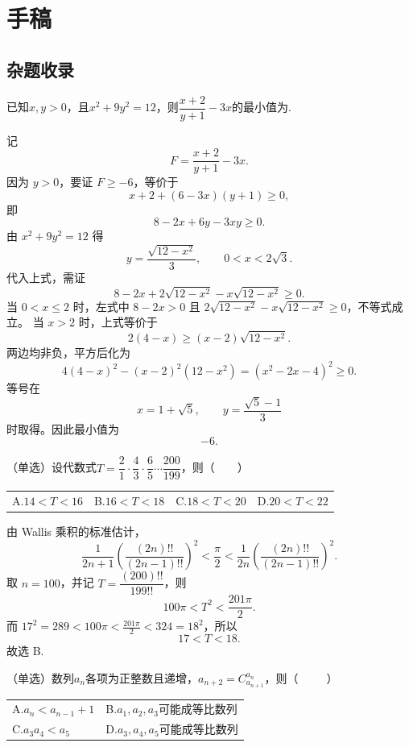 \chapter{手稿}
\section{杂题收录}
\begin{example}
    已知$x,y>0$，且$x^2+9y^2=12$，则$\dfrac{x+2}{y+1}-3x$的最小值为\underline{\hspace{2cm}}.
\end{example}
\begin{solution}
记
\[
F=\frac{x+2}{y+1}-3x.
\]
因为 $y>0$，要证 $F\ge -6$，等价于
\[
x+2+(6-3x)(y+1)\ge 0,
\]
即
\[
8-2x+6y-3xy\ge 0.
\]
由 $x^2+9y^2=12$ 得
\[
y=\frac{\sqrt{12-x^2}}{3},\qquad 0<x<2\sqrt3.
\]
代入上式，需证
\[
8-2x+2\sqrt{12-x^2}-x\sqrt{12-x^2}\ge0.
\]
当 $0<x\le2$ 时，左式中 $8-2x>0$ 且 $2\sqrt{12-x^2}-x\sqrt{12-x^2}\ge0$，不等式成立。
当 $x>2$ 时，上式等价于
\[
2(4-x)\ge (x-2)\sqrt{12-x^2}.
\]
两边均非负，平方后化为
\[
4(4-x)^2-(x-2)^2(12-x^2)=(x^2-2x-4)^2\ge0.
\]
等号在
\[
x=1+\sqrt5,\qquad y=\frac{\sqrt5-1}{3}
\]
时取得。因此最小值为
\[
-6.
\]
\end{solution}
\newpage
\begin{example}[（高考题改编）]
    （单选）设代数式$\displaystyle T = \dfrac21\cdot\dfrac{4}{3}\cdot\dfrac{6}{5}\cdots\dfrac{200}{199}$，则（~~~~）

    \begin{tabular}{@{}llll@{}}
        A.$14< T < 16$&B.$16 < T < 18$&C.$18< T < 20$&D.$20< T < 22$
    \end{tabular}
\end{example}
\begin{solution}
    由 Wallis 乘积的标准估计，
    \[
    \frac{1}{2n+1}\left(\frac{(2n)!!}{(2n-1)!!}\right)^2<\frac{\pi}{2}<\frac{1}{2n}\left(\frac{(2n)!!}{(2n-1)!!}\right)^2.
    \]
    取 $n=100$，并记 $T=\dfrac{(200)!!}{199!!}$，则
    \[
    100\pi<T^2<\frac{201\pi}{2}.
    \]
    而 $17^2=289<100\pi<\frac{201\pi}{2}<324=18^2$，所以
    \[
    17<T<18.
    \]
    故选 B.
\end{solution}
\begin{example}[（高考题改编）]
    （单选）数列$a_{n}$各项为正整数且递增，$a_{n+2}=C_{a_{n+1}}^{a_{n}}$，则（~~~~~）

    \begin{tabular}{@{}ll@{}}
        A.$a_n<a_{n-1}+1$&B.$a_1,a_2,a_3$可能成等比数列\\
        C.$a_3a_4<a_5$&D.$a_3,a_4,a_5$可能成等比数列
    \end{tabular}
\end{example}
